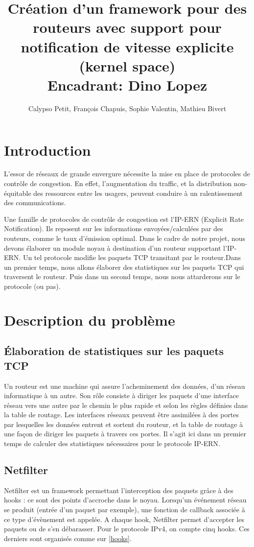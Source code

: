 \documentclass[a4paper]{article}
\title{Création d'un framework pour des routeurs
	avec support pour notification de vitesse explicite
	(kernel space)\\Encadrant: Dino Lopez}
\author{Calypso Petit, François Chapuis, Sophie Valentin, Mathieu Bivert}
\begin{document}
\maketitle
\tableofcontents

\section{Introduction}
L'essor de réseaux de grande envergure nécessite la mise en
place de protocoles de contrôle de congestion. En effet,
l'augmentation du traffic, et la distribution non-équitable
des ressources entre les usagers, peuvent conduire à un
ralentissement des communications.

Une famille de protocoles de contrôle de congestion est l'IP-ERN
(Explicit Rate Notification). Ils reposent sur les informations
envoyées/calculées par des routeurs, comme le taux d'émission
optimal. Dans le cadre de notre projet, nous devons élaborer un
module noyau à destination d'un routeur supportant l'IP-ERN.
Un tel protocole modifie les paquets TCP transitant par le
routeur.Dans un premier temps, nous allons élaborer des statistiques
sur les paquets TCP qui traversent le routeur. Puis dans un
second temps, nous nous attarderons sur le protocole (ou pas).

\section{Description du problème}
\subsection{Élaboration de statistiques sur les paquets TCP}
Un routeur est une machine qui assure l’acheminement des données,
d'un réseau informatique à un autre. Son rôle consiste à diriger
les paquets d'une interface réseau vers une autre par le chemin
le plus rapide et selon les règles définies dans la table de
routage. Les interfaces réseaux peuvent être assimilées à des
portes par lesquelles les données entrent et sortent du routeur, et
la table de routage à une façon de diriger les paquets à travers
ces portes. Il s'agit ici dans un premier temps de calculer
des statistiques nécessaires pour le protocole IP-ERN.

\subsection{Netfilter}
Netfilter est un framework permettant l'interception des paquets
grâce à des hooks : ce sont des points d'accroche dans le noyau.
Lorsqu'un événement réseau se produit (entrée d'un paquet par exemple),
une fonction de callback associée à ce type d'évènement est appelée.
A chaque hook, Netfilter permet d'accepter les paquets ou de s'en
débarasser. Pour le protocole IPv4, on compte cinq hooks. Ces derniers
sont organisés comme sur \ref{hooks}.
\end{document}
